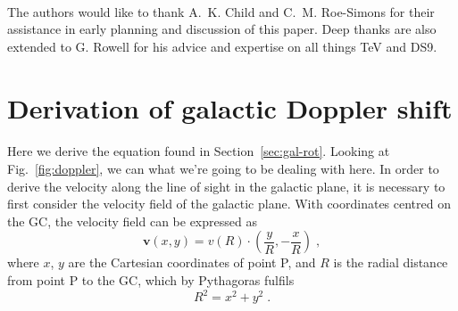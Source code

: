 \documentclass[a4paper, titlepage, oneside]{article}
\begin{document}
\begin{multicols}{2}
\paragraph{}
The authors would like to thank A.~K. Child and C.~M. Roe-Simons for their assistance in early planning and discussion of this paper. Deep thanks are also extended to G. Rowell for his advice and expertise on all things TeV and DS9.
\end{multicols}

\printbibliography[heading = bibintoc] %

\newpage

\appendix

\section{Derivation of galactic Doppler shift}
\label{app:doppler}
\paragraph{}
Here we derive the equation found in Section~\ref{sec:gal-rot}. Looking at Fig.~\ref{fig:doppler}, we can what we're going to be dealing with here. In order to derive the velocity along the line of sight in the galactic plane, it is necessary to first consider the velocity field of the galactic plane. With coordinates centred on the GC, the velocity field can be expressed as
\begin{equation}
  \label{eq:vel-field}
  \mathbf{v}(x,y)=v(R)\cdot\!\left(\frac{y}{R},-\frac{x}{R}\right)\;,
\end{equation}
where \(x\), \(y\) are the Cartesian coordinates of point P, and \(R\) is the radial distance from point P to the GC, which by Pythagoras fulfils
\begin{equation}
  R^2=x^2+y^2\;.
\end{equation}
\end{document}
